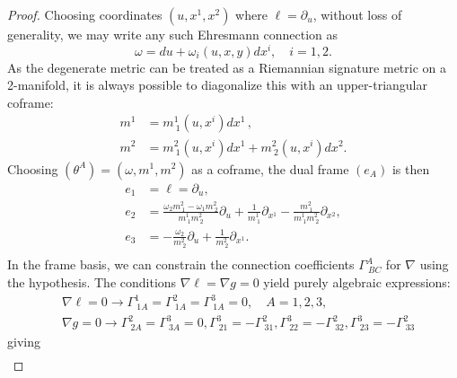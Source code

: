\documentclass{article}
\newcommand{\ai}{A}
\newcommand{\bb}{B}
\newcommand{\cc}{C}
\theoremstyle{definition}
\theoremstyle{remark}
\begin{document}
\begin{proof}
    Choosing coordinates $(u,x^1,x^2)$ where $\ell = \partial_u$, without loss of generality, we may write any such Ehresmann connection as
    \begin{equation} 
        \omega = du + \omega_i (u,x,y) dx^i,\quad i =1,2. 
    \end{equation} 
    As the degenerate metric can be treated as a Riemannian signature metric on a 2-manifold, it is always possible to diagonalize this with an upper-triangular coframe:
     \begin{equation} \begin{aligned}
       m^1 &= m^1_{~1}(u, x^i) dx^1\,, \\
       m^2 &= m^2_{~1}(u,x^i) dx^1 + m^2_{~2}(u,x^i) dx^2.
    \end{aligned} \end{equation}
    Choosing $(\theta^\ai) = (\omega, m^1, m^2)$ as a coframe, the dual frame $(e_\ai)$ is then 
    \begin{equation} \begin{aligned}
        e_1 &= \ell = \partial_u, \\
        e_2 &= \frac{\omega_2 m^2_{~1} - \omega_1 m^2_{~2}}{m^1_{~1} m^2_{~2}} \partial_u + \frac{1}{m^1_{~1}} \partial_{x^1} - \frac{m^2_{~1}}{m^1_{~1} m^2_{~2}} \partial_{x^2}, \\
        e_3 &= - \frac{\omega_2}{m^2_{~2}} \partial_{u} + \frac{1}{m^2_{~2}} \partial_{x^1} .\\ 
    \end{aligned} \end{equation}
    In the frame basis, we can constrain the connection coefficients $\Gamma^\ai_{~\bb\cc}$ for $\nabla$ using the hypothesis. The conditions $\nabla \ell = \nabla g  =0$ yield purely algebraic expressions:
    \begin{equation}
    \begin{aligned}
        & \nabla \ell = 0 \rightarrow  \Gamma^{1}_{~1\ai}= \Gamma^{2}_{~1\ai}=\Gamma^{3}_{~1\ai} = 0, \quad \ai = 1,2,3, \\
        &\nabla g= 0 \rightarrow \Gamma^{2}_{~2\ai}=\Gamma^{3}_{~3\ai}=0, \Gamma^{3}_{~21} = -\Gamma^{2}_{~31}, \Gamma^{3}_{~22} = -\Gamma^{2}_{~32},\Gamma^{3}_{~23} = -\Gamma^{2}_{~33} 
    \end{aligned}
    \end{equation}
    giving
    \begin{equation} \begin{aligned}

\end{aligned}
\end{equation}
\end{proof}
\end{document}
